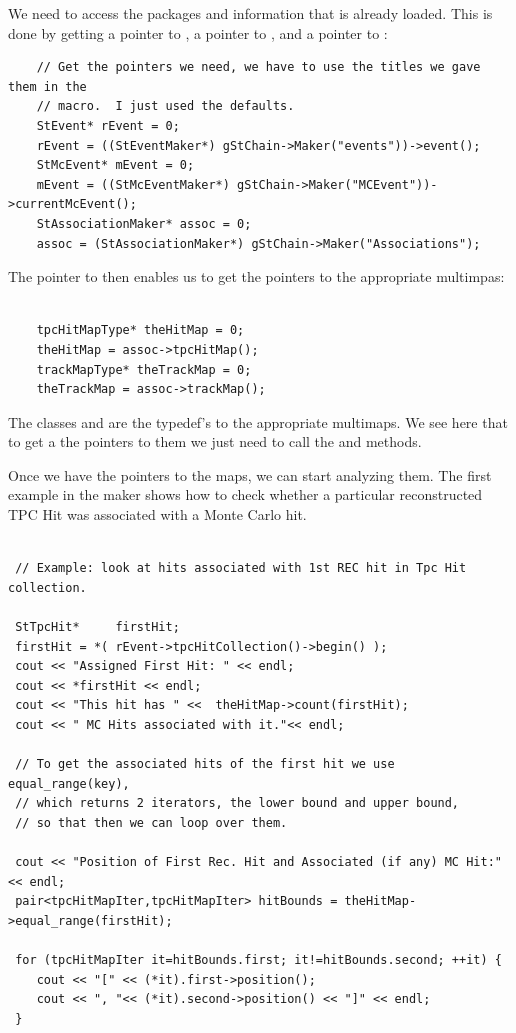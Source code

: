 We need to access the packages and information that is already loaded.  This is done
by getting a pointer to , a pointer to , and a pointer
to :

\begin{verbatim}
    // Get the pointers we need, we have to use the titles we gave them in the
    // macro.  I just used the defaults.
    StEvent* rEvent = 0;
    rEvent = ((StEventMaker*) gStChain->Maker("events"))->event();
    StMcEvent* mEvent = 0;
    mEvent = ((StMcEventMaker*) gStChain->Maker("MCEvent"))->currentMcEvent();
    StAssociationMaker* assoc = 0;
    assoc = (StAssociationMaker*) gStChain->Maker("Associations");
\end{verbatim}

The pointer to  then enables us to get the pointers to the
appropriate multimpas:

\begin{verbatim}

    tpcHitMapType* theHitMap = 0;
    theHitMap = assoc->tpcHitMap();
    trackMapType* theTrackMap = 0;
    theTrackMap = assoc->trackMap();

\end{verbatim}

The classes  and  are the typedef's to the
appropriate multimaps.    
We see here that to get a the pointers to them we just need to call
the  and  methods.

Once we have the pointers to the maps, we can start analyzing them.  The first example
in the maker shows how to check whether a particular reconstructed TPC Hit was associated
with a Monte Carlo hit. 

\begin{verbatim}

 // Example: look at hits associated with 1st REC hit in Tpc Hit collection.

 StTpcHit*     firstHit;
 firstHit = *( rEvent->tpcHitCollection()->begin() );
 cout << "Assigned First Hit: " << endl;
 cout << *firstHit << endl;
 cout << "This hit has " <<  theHitMap->count(firstHit);
 cout << " MC Hits associated with it."<< endl;

 // To get the associated hits of the first hit we use equal_range(key),
 // which returns 2 iterators, the lower bound and upper bound,
 // so that then we can loop over them.
    
 cout << "Position of First Rec. Hit and Associated (if any) MC Hit:" << endl;
 pair<tpcHitMapIter,tpcHitMapIter> hitBounds = theHitMap->equal_range(firstHit);

 for (tpcHitMapIter it=hitBounds.first; it!=hitBounds.second; ++it) {
    cout << "[" << (*it).first->position();
    cout << ", "<< (*it).second->position() << "]" << endl;
 }
\end{verbatim}

